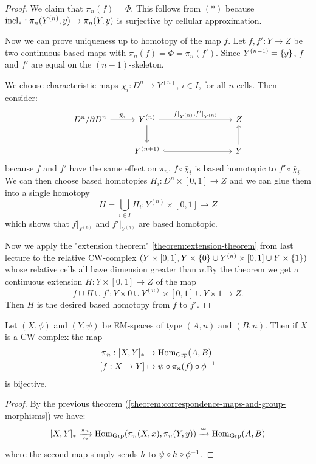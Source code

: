 \begin{proof}
We claim that $\pi_n(f)=\Phi$. This follows from $(*)$ because $\operatorname{incl}_*:\pi_n(Y^{(n)},y)\to\pi_n(Y,y)$ is surjective by cellular approximation.

Now we can prove uniqueness up to homotopy of the map $f$. Let $f,f':Y\to Z$ be two continuous based maps with $\pi_n(f)=\Phi=\pi_n(f')$. Since $Y^{({n-1})}=\{y\}$, $f$ and $f'$ are equal on the $(n-1)$-skeleton.

We choose characteristic maps $\chi_i:D^n\to Y^{(n)}$, $i\in I$, for all $n$-cells. Then consider:
\[
\begin{tikzcd}
D^n/\de D^n \ar[r,"\bar\chi_i"] & Y^{(n)} \ar[d] \ar[r,"{f|_{Y^{(n)}},f'|_{Y^{(n)}}}"] &[20mm] Z\\
& Y^{(n+1)} \ar[r,hook] & Y \ar[u]
\end{tikzcd}
\]
because $f$ and $f'$ have the same effect on $\pi_n$, $f\circ\bar\chi_i$ is based homotopic to $f'\circ\bar\chi_i$. We can then choose based homotopies $H_i:D^n\times[0,1]\to Z$ and we can glue them into a single homotopy
\[H=\bigcup_{i\in I}H_i:Y^{(n)}\times[0,1]\to Z\]
which shows that $f|_{Y^{(n)}}$ and $f'|_{Y^{(n)}}$ are based homotopic.

Now we apply the "extension theorem" \ref{theorem:extension-theorem} from last lecture to the relative CW-complex $(Y\times[0,1],Y\times\{0\}\cup Y^{(n)}\times[0,1]\cup Y\times\{1\})$ whose relative cells all have dimension greater than $n$.By the theorem we get a continuous extension $\bar H:Y\times[0,1]\to Z$ of the map
\[f\cup H\cup f':Y\times0\cup Y^{(n)}\times[0,1]\cup Y\times1\to Z.\]
Then $\bar H$ is the desired based homotopy from $f$ to $f'$.
\end{proof}

\begin{theorem}\label{theorem:correspondence-maps-and-group-morphisms-EM}
Let $(X,\phi)$ and $(Y,\psi)$ be EM-spaces of type $(A,n)$ and $(B,n)$. Then if $X$ is a CW-complex the map
\begin{align*}
    \pi_n:[X,Y]_*&\to\Hom_\Grp(A,B)\\
    [f:X\to Y]&\mapsto\psi\circ\pi_n(f)\circ\phi^\inv
\end{align*}
is bijective.
\end{theorem}

\begin{proof}
By the previous theorem (\ref{theorem:correspondence-maps-and-group-morphisms}) we have:
\[
    [X,Y]_*\underset{\cong}{\xrightarrow{\pi_n}}\operatorname{Hom}_{\mathrm{Grp}}(\pi_n(X,x),\pi_n(Y,y))\xrightarrow{\cong}\operatorname{Hom}_{\mathrm{Grp}}(A,B)
\]
where the second map simply sends $h$ to $\psi\circ h\circ\phi^\inv$.
\end{proof}

